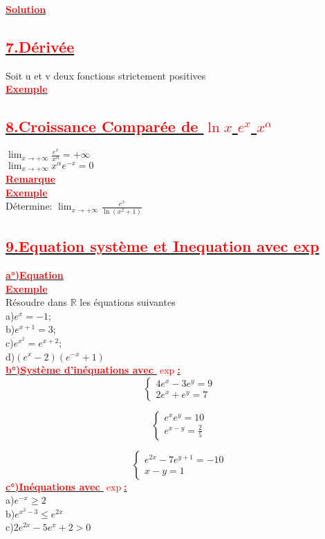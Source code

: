\documentclass[12pt]{article}
\begin{document}
\underline{\textbf{\textcolor{red}{Solution}}}\\
\subsection*{\underline{\textbf{\textcolor{red}{7.Dérivée}}}}
Soit u et v deux fonctions strictement positives \\

\underline{\textbf{\textcolor{red}{Exemple}}}\\
\subsection*{\underline{\textbf{\textcolor{red}{8.Croissance Comparée de $\ln x$ $e^{x}$ $x^{\alpha}$}}}}
$\lim_{x \to +\infty}\frac{e^{x}}{x^{\alpha}}=+\infty$\\
$\lim_{x \to +\infty}x^{\alpha}e^{-x}=0$\\
\underline{\textbf{\textcolor{red}{Remarque}}}\\
\underline{\textbf{\textcolor{red}{Exemple}}}\\
Détermine: $\lim_{x \to +\infty}\frac{e^{x}}{\ln(x^{2}+1)}$
\subsection*{\underline{\textbf{\textcolor{red}{9.Equation système et Inequation avec exp}}}}
\underline{\textbf{\textcolor{red}{a°)Equation}}}\\
\underline{\textbf{\textcolor{red}{Exemple}}}\\
Résoudre dans $\mathbb{R}$ les équations suivantes\\
a)$e^{x}=-1$;\\  b)$e^{x+1}=3$;\\ c)$e^{x^{2}}=e^{x+2}$;\\ d)$(e^{x}-2)(e^{-x}+1)$\\
\underline{\textbf{\textcolor{red}{b°)Système d'inéquations avec $\exp$:}}}\\
\[
\begin{cases}
4e^{x}-3e^{y} = 9 \\
2e^{x}+e^{y} = 7
\end{cases}
\]

\[
\begin{cases}
e^{x}e^{y} = 10 \\
e^{x-y} = \frac{2}{5}
\end{cases}
\]

\[
\begin{cases}
e^{2x}-7e^{y+1} = -10 \\
x-y = 1
\end{cases}
\]
\underline{\textbf{\textcolor{red}{c°)Inéquations avec $\exp$:}}}\\
a)$e^{-x}\geq2$\\
b)$e^{x^{2}-3}\leq e^{2x}$\\
c)$2e^{2x}-5e^{x}+2>0$
\end{document}
